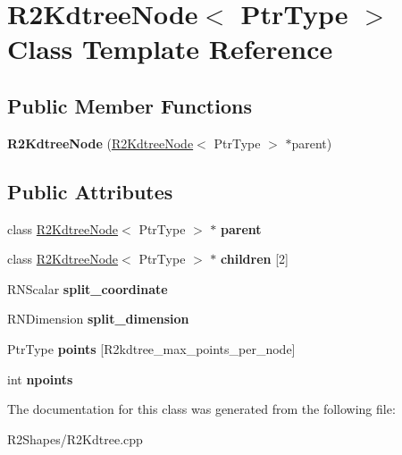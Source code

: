 \hypertarget{class_r2_kdtree_node}{}\section{R2\+Kdtree\+Node$<$ Ptr\+Type $>$ Class Template Reference}
\label{class_r2_kdtree_node}
\subsection*{Public Member Functions}
\begin{DoxyCompactItemize}
\item 
{\bfseries R2\+Kdtree\+Node} (\hyperlink{class_r2_kdtree_node}{R2\+Kdtree\+Node}$<$ Ptr\+Type $>$ $\ast$parent)\hypertarget{class_r2_kdtree_node_a93c9b28169913ce1ae79b14d6c6e03e3}{}\label{class_r2_kdtree_node_a93c9b28169913ce1ae79b14d6c6e03e3}

\end{DoxyCompactItemize}
\subsection*{Public Attributes}
\begin{DoxyCompactItemize}
\item 
class \hyperlink{class_r2_kdtree_node}{R2\+Kdtree\+Node}$<$ Ptr\+Type $>$ $\ast$ {\bfseries parent}\hypertarget{class_r2_kdtree_node_a7d0299f66e13d8a14282092e7df8e5df}{}\label{class_r2_kdtree_node_a7d0299f66e13d8a14282092e7df8e5df}

\item 
class \hyperlink{class_r2_kdtree_node}{R2\+Kdtree\+Node}$<$ Ptr\+Type $>$ $\ast$ {\bfseries children} \mbox{[}2\mbox{]}\hypertarget{class_r2_kdtree_node_ae0d684293b38c0e7635d95a01aa582c9}{}\label{class_r2_kdtree_node_ae0d684293b38c0e7635d95a01aa582c9}

\item 
R\+N\+Scalar {\bfseries split\+\_\+coordinate}\hypertarget{class_r2_kdtree_node_a6b86774bdfeb5948ab2da78884d3660c}{}\label{class_r2_kdtree_node_a6b86774bdfeb5948ab2da78884d3660c}

\item 
R\+N\+Dimension {\bfseries split\+\_\+dimension}\hypertarget{class_r2_kdtree_node_aa24e804c49f780ef0568433de78c8adc}{}\label{class_r2_kdtree_node_aa24e804c49f780ef0568433de78c8adc}

\item 
Ptr\+Type {\bfseries points} \mbox{[}R2kdtree\+\_\+max\+\_\+points\+\_\+per\+\_\+node\mbox{]}\hypertarget{class_r2_kdtree_node_a5a7889b275aba78c34476c37b6bdfe99}{}\label{class_r2_kdtree_node_a5a7889b275aba78c34476c37b6bdfe99}

\item 
int {\bfseries npoints}\hypertarget{class_r2_kdtree_node_a89b1dd6f177276a686b959afdf9b4362}{}\label{class_r2_kdtree_node_a89b1dd6f177276a686b959afdf9b4362}

\end{DoxyCompactItemize}


The documentation for this class was generated from the following file\+:\begin{DoxyCompactItemize}
\item 
R2\+Shapes/R2\+Kdtree.\+cpp\end{DoxyCompactItemize}
